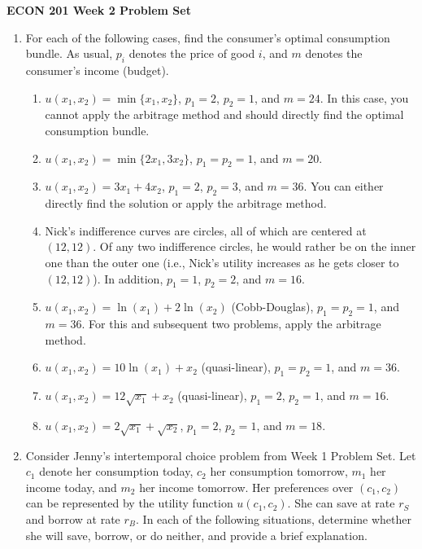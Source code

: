 \documentclass[11pt]{article}
\begin{document}
\begin{center}
\textbf{ECON 201 Week 2 Problem Set}
\end{center}

\begin{enumerate}

\item For each of the following cases, find the consumer's optimal consumption bundle. As usual, $p_{i}$ denotes the price of good $i$, and $m$ denotes the consumer's income (budget).
    \begin{enumerate}
        \item $u(x_{1},x_{2})=\min\{x_{1},x_{2}\}$, $p_{1}=2$, $p_{2}=1$, and $m=24$. In this case, you cannot apply the arbitrage method and should directly find the optimal consumption bundle.

        \item $u(x_{1},x_{2})=\min\{2x_{1},3x_{2}\}$, $p_{1}=p_{2}=1$, and $m=20$.

        \item $u(x_{1},x_{2})=3x_{1}+4x_{2}$, $p_{1}=2$, $p_{2}=3$, and $m=36$. You can either directly find the solution or apply the arbitrage method.


        \item Nick's indifference curves are circles, all of which are centered at $(12,12)$. Of any two indifference circles, he would rather be on the inner one than the outer one (i.e., Nick's utility increases as he gets closer to $(12,12)$). In addition, $p_{1}=1$, $p_{2}=2$, and $m=16$.

        \item $u(x_{1},x_{2})=\ln(x_{1})+2\ln(x_{2})$ (Cobb-Douglas), $p_{1}=p_{2}=1$, and $m=36$. For this and subsequent two problems, apply the arbitrage method.


        \item $u(x_{1},x_{2})=10\ln(x_{1})+x_{2}$ (quasi-linear), $p_{1}=p_{2}=1$, and $m=36$.

        \item $u(x_{1},x_{2})=12\sqrt{x_{1}}+x_{2}$ (quasi-linear), $p_{1}=2$, $p_{2}=1$, and $m=16$.

        \item $u(x_{1},x_{2})=2\sqrt{x_{1}}+\sqrt{x_{2}}$, $p_{1}=2$, $p_{2}=1$, and $m=18$.
    \end{enumerate}

\item Consider Jenny's intertemporal choice problem from Week 1 Problem Set. Let $c_{1}$ denote her consumption today, $c_{2}$ her consumption tomorrow, $m_{1}$ her income today, and $m_{2}$ her income tomorrow. Her preferences over $(c_{1},c_{2})$ can be represented by the utility function $u(c_{1},c_{2})$. She can save at rate $r_{S}$ and borrow at rate $r_{B}$. In each of the following situations, determine whether she will save, borrow, or do neither, and provide a brief explanation.


\end{enumerate}
\end{document}
